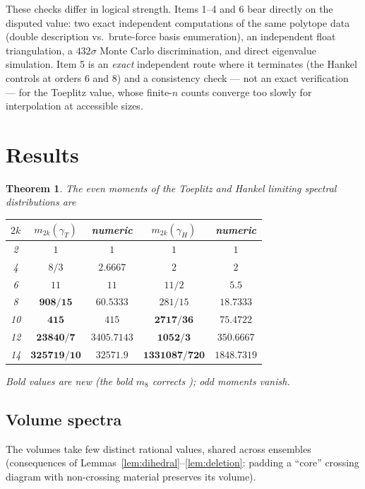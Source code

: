 ﻿\documentclass[11pt]{article}
\newtheorem{theorem}{Theorem}[section]
\theoremstyle{remark}
\newcommand{\gT}{\gamma_T}
\newcommand{\gH}{\gamma_H}
\begin{document}
These checks differ in logical strength. Items 1--4 and 6 bear directly
on the disputed value: two exact independent computations of the same polytope data
(double description vs.\ brute-force basis enumeration), an independent float
triangulation, a $432\sigma$ Monte Carlo discrimination, and direct eigenvalue
simulation. Item 5 is an \emph{exact} independent route where it terminates (the
Hankel controls at orders $6$ and $8$) and a consistency check --- not an exact
verification --- for the Toeplitz value, whose finite-$n$ counts converge too slowly
for interpolation at accessible sizes.

\section{Results}\label{sec:results}

\begin{theorem}\label{thm:values}
The even moments of the Toeplitz and Hankel limiting spectral distributions are
\begin{center}
\begin{tabular}{c|cc|cc}
\toprule
$2k$ & $m_{2k}(\gT)$ & numeric & $m_{2k}(\gH)$ & numeric\\
\midrule
2  & $1$ & $1$ & $1$ & $1$\\
4  & $8/3$ & $2.6667$ & $2$ & $2$\\
6  & $11$ & $11$ & $11/2$ & $5.5$\\
8  & $\mathbf{908/15}$ & $60.5333$ & $281/15$ & $18.7333$\\
10 & $\mathbf{415}$ & $415$ & $\mathbf{2717/36}$ & $75.4722$\\
12 & $\mathbf{23840/7}$ & $3405.7143$ & $\mathbf{1052/3}$ & $350.6667$\\
14 & $\mathbf{325719/10}$ & $32571.9$ & $\mathbf{1331087/720}$ & $1848.7319$\\
\bottomrule
\end{tabular}
\end{center}
Bold values are new (the bold $m_8$ corrects \cite{HM}); odd moments vanish.
\end{theorem}

\subsection{Volume spectra}
The volumes take few distinct rational values, shared across ensembles
(consequences of Lemmas~\ref{lem:dihedral}--\ref{lem:deletion}: padding a ``core''
crossing diagram with non-crossing material preserves its volume).
\end{document}
